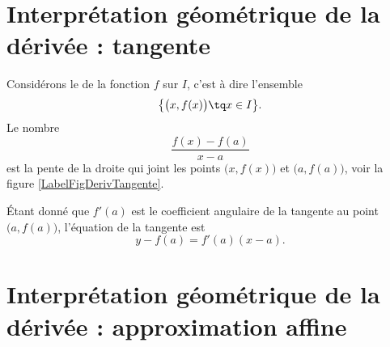 \section[Interprétation géométrique : tangente]{Interprétation géométrique de la dérivée : tangente}

Considérons le  de la fonction $f$ sur $I$, c'est à dire l'ensemble
\begin{equation}
	\big\{ \big( x,f(x) \big)\tq x\in I \big\}.
\end{equation}
Le nombre 
\begin{equation}
	\frac{ f(x)-f(a) }{ x-a }
\end{equation}
est la pente de la droite qui joint les points $\big( x,f(x) \big)$ et $\big( a,f(a) \big)$, voir la figure \ref{LabelFigDerivTangente}.
\newcommand{\CaptionFigDerivTangente}{Le coefficient angulaire de la corde entre $a$ et $x$.}


Étant donné que $f'(a)$ est le coefficient angulaire de la tangente au point $\big( a,f(a) \big)$, l'équation de la tangente est
\begin{equation}		\label{EqTgfaen}
	y-f(a)=f'(a)(x-a).
\end{equation}

\section[Interprétation géométrique : approximation affine]{Interprétation géométrique de la dérivée : approximation affine}

